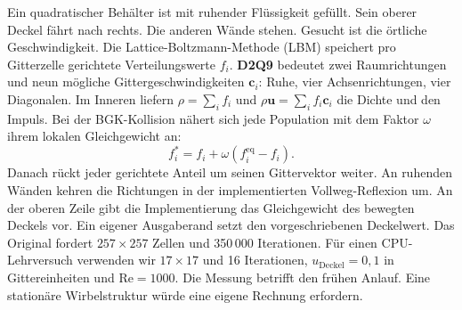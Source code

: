 Ein quadratischer Behälter ist mit ruhender Flüssigkeit gefüllt. Sein oberer Deckel fährt nach rechts. Die anderen Wände stehen. Gesucht ist die örtliche Geschwindigkeit. Die Lattice-Boltzmann-Methode (LBM) speichert pro Gitterzelle gerichtete Verteilungswerte \(f_i\). \textbf{D2Q9} bedeutet zwei Raumrichtungen und neun mögliche Gittergeschwindigkeiten \(\mathbf c_i\): Ruhe, vier Achsenrichtungen, vier Diagonalen.
Im Inneren liefern \(\rho=\sum_i f_i\) und \(\rho\mathbf u=\sum_i f_i\mathbf c_i\) die Dichte und den Impuls. Bei der BGK-Kollision nähert sich jede Population mit dem Faktor \(\omega\) ihrem lokalen Gleichgewicht an:
\[
 f_i^*=f_i+\omega(f_i^{\mathrm{eq}}-f_i).
\]
Danach rückt jeder gerichtete Anteil um seinen Gittervektor weiter. An ruhenden Wänden kehren die Richtungen in der implementierten Vollweg-Reflexion um. An der oberen Zeile gibt die Implementierung das Gleichgewicht des bewegten Deckels vor. Ein eigener Ausgaberand setzt den vorgeschriebenen Deckelwert.
Das Original fordert \(257\times257\) Zellen und 350\,000 Iterationen. Für einen CPU-Lehrversuch verwenden wir \(17\times17\) und 16 Iterationen, \(u_\mathrm{Deckel}=0{,}1\) in Gittereinheiten und \(\mathrm{Re}=1000\). Die Messung betrifft den frühen Anlauf. Eine stationäre Wirbelstruktur würde eine eigene Rechnung erfordern.

